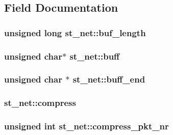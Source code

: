 \subsection{Field Documentation}
\hypertarget{structst__net_a4c85ad00063e8dc380d73c61b8556c3a}{}
\subsubsection[{buf\+\_\+length}]{\setlength{\rightskip}{0pt plus 5cm}unsigned long st\+\_\+net\+::buf\+\_\+length}\label{structst__net_a4c85ad00063e8dc380d73c61b8556c3a}
\hypertarget{structst__net_a3acff748ebe3823c50d6c77d09281c79}{}
\subsubsection[{buff}]{\setlength{\rightskip}{0pt plus 5cm}unsigned char$\ast$ st\+\_\+net\+::buff}\label{structst__net_a3acff748ebe3823c50d6c77d09281c79}
\hypertarget{structst__net_ab8bc042e4c3feef2117642cee822dc65}{}
\subsubsection[{buff\+\_\+end}]{\setlength{\rightskip}{0pt plus 5cm}unsigned char $\ast$ st\+\_\+net\+::buff\+\_\+end}\label{structst__net_ab8bc042e4c3feef2117642cee822dc65}
\hypertarget{structst__net_ae72db65cba31233b606eacd0a0da5769}{}
\subsubsection[{compress}]{ st\+\_\+net\+::compress}\label{structst__net_ae72db65cba31233b606eacd0a0da5769}
\hypertarget{structst__net_aee8117a193c6eaf0166b6d140fdc7c8e}{}
\subsubsection[{compress\+\_\+pkt\+\_\+nr}]{\setlength{\rightskip}{0pt plus 5cm}unsigned int st\+\_\+net\+::compress\+\_\+pkt\+\_\+nr}\label{structst__net_aee8117a193c6eaf0166b6d140fdc7c8e}
\hypertarget{structst__net_af25692866530d247001f5c189ffca8f6}{}
